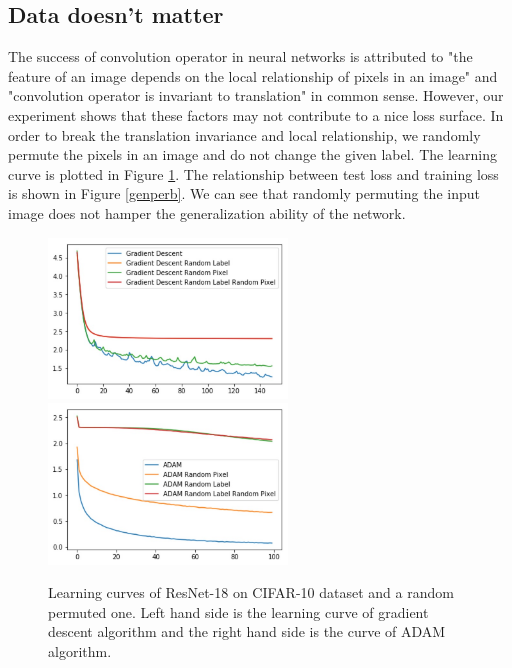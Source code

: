 \documentclass{article}
\theoremstyle{plain}
\theoremstyle{definition}
\begin{document}


\subsection{Data doesn't matter}

The success of convolution operator in neural networks is attributed to "the feature of an image depends on the local relationship of pixels in an image" and "convolution operator is invariant to translation" in common sense. However, our experiment shows that these factors may not contribute to a nice loss surface. In order to break the translation invariance and local relationship, we randomly permute the pixels in an image and do not change the given label. The learning curve is plotted in Figure \ref{randomperb}. The relationship between test loss and training loss is shown in Figure \ref{genperb}. We can see that randomly permuting the input image does not hamper the generalization ability of the network.

\begin{figure}[H]
    \centering
    \includegraphics[width=2.5in]{gdrp.jpg}
    \includegraphics[width=2.5in]{adamrp.jpg}
    \caption{Learning curves of ResNet-18 on CIFAR-10 dataset and a random permuted one. Left hand side is the learning curve of gradient descent algorithm and the right hand side is the curve of ADAM algorithm.}
    \label{randomperb}
\end{figure}
\end{document}
